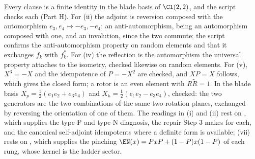 Every clause is a finite identity in the blade basis of $\Cl(2,2)$, and the script checks each (Part H). For (ii) the adjoint is reversion composed with the automorphism $e_{3}, e_{4} \mapsto -e_{3}, -e_{4}$: an anti-automorphism, being an automorphism composed with one, and an involution, since the two commute; the script confirms the anti-automorphism property on random elements and that it exchanges $f_{k}$ with $f_{k}^{*}$. For (iv) the reflection is the automorphism the universal property attaches to the isometry, checked likewise on random elements. For (v), $X^{3} = -X$ and the idempotence of $P = -X^{2}$ are checked, and $XP = X$ follows, which gives the closed form; a rotor is an even element with $R\widetilde{R} = 1$. In the blade basis $X_{p} = \tfrac12(e_{1}e_{2} + e_{3}e_{4})$ and $X_{h} = \tfrac12(e_{1}e_{2} - e_{3}e_{4})$, checked: the two generators are the two combinations of the same two rotation planes, exchanged by reversing the orientation of one of them. The readings in (i) and (ii) rest on , which supplies the type-P and type-N diagnosis, the repair Step 3 makes for each, and the canonical self-adjoint idempotents where a definite form is available; (vii) rests on , which supplies the pinching $\EN(x) = PxP + (1-P)x(1-P)$ of each rung, whose kernel is the ladder sector.
